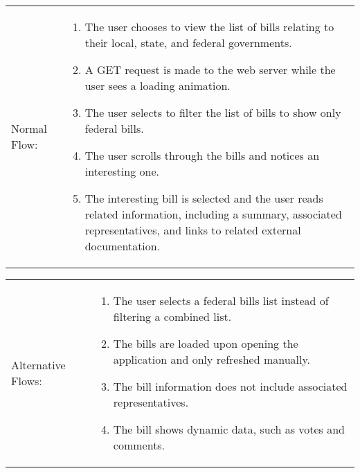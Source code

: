 \documentclass{beamer}
\begin{document}
  \begin{frame}
    \begin{tabu}{lX}
Normal Flow:&
\begin{enumerate}
\item The user chooses to view the list of bills relating to their local, state, and federal governments.
\item A GET request is made to the web server while the user sees a loading animation.
\item The user selects to filter the list of bills to show only federal bills.
\item The user scrolls through the bills and notices an interesting one.
\item The interesting bill is selected and the user reads related information, including a summary, associated representatives, and links to related external documentation.
\end{enumerate}
\end{tabu}
\end{frame}
  \begin{frame}
    \begin{tabu}{lX}
Alternative Flows:&
\begin{enumerate}
\item The user selects a federal bills list instead of filtering a combined list.
\item The bills are loaded upon opening the application and only refreshed manually.
\item The bill information does not include associated representatives.
\item The bill shows dynamic data, such as votes and comments.
\end{enumerate}\\
\end{tabu}
\end{frame}
\end{document}
